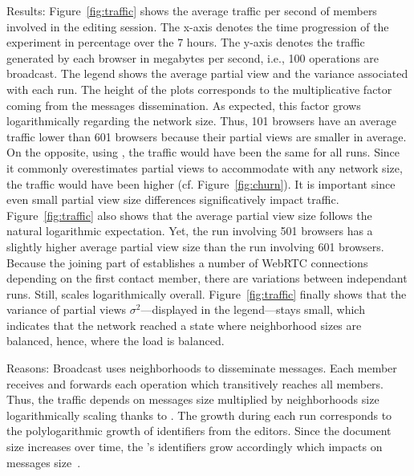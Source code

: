 \begin{asparadesc}
\item [Results:] Figure~\ref{fig:traffic} shows the average traffic
  per second of members involved in the editing session. The x-axis
  denotes the time progression of the experiment in percentage over
  the 7 hours. The y-axis denotes the traffic generated by each
  browser in megabytes per second, i.e., 100 operations are
  broadcast. The legend shows the average partial view and the
  variance associated with each run. The height of the plots
  corresponds to the multiplicative factor coming from the messages
  dissemination. As expected, this factor grows logarithmically
  regarding the network size. Thus, 101 browsers have an average
  traffic lower than 601 browsers because their partial views are
  smaller in average.  On the opposite, using \CYCLON, the traffic
  would have been the same for all runs. Since it commonly
  overestimates partial views to accommodate with any network size,
  the traffic would have been higher (cf. Figure~\ref{fig:churn}). It
  is important since even small partial view size differences
  significatively impact traffic.  Figure~\ref{fig:traffic} also shows
  that the average partial view size follows the natural logarithmic
  expectation. Yet, the run involving 501 browsers has a slightly
  higher average partial view size than the run involving 601
  browsers. Because the joining part of \SPRAY establishes a number of
  WebRTC connections depending on the first contact member, there are
  variations between independant runs. Still, \SPRAY scales
  logarithmically overall. Figure~\ref{fig:traffic} finally shows that
  the variance of partial views $\sigma^2$---displayed in the
  legend---stays small, which indicates that the network reached a
  state where neighborhood sizes are balanced, hence, where the load is
  balanced.
\item [Reasons:] Broadcast uses neighborhoods to disseminate messages. Each
  member receives and forwards each operation which transitively reaches all
  members. Thus, the traffic depends on messages size multiplied by
  neighborhoods size logarithmically scaling thanks to \SPRAY. The growth during
  each run corresponds to the polylogarithmic growth of identifiers from the
  editors. Since the document size increases over time, the \LSEQ's identifiers
  grow accordingly which impacts on messages size~\cite{nedelec2013lseq}.
\end{asparadesc}




